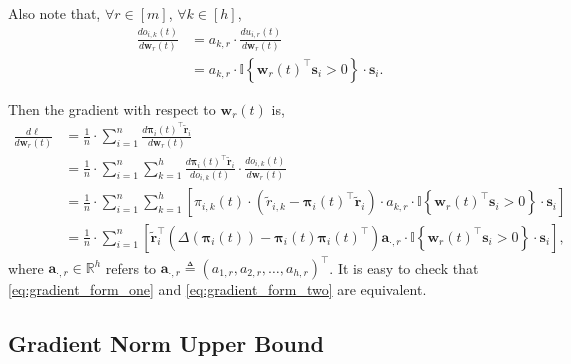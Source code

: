\documentclass[10pt]{article}
\def\rva{{\mathbf{a}}}
\def\rvs{{\mathbf{s}}}
\def\rvw{{\mathbf{w}}}
\def\rvtilder{{\tilde{\mathbf{r}}}}
\def\rvpi{{\boldsymbol{\pi}}}
\def\sR{{\mathbb{R}}}
\def\sI{{\mathbb{I}}}
\begin{document}
\noindent Also note that, $\forall r \in [m]$, $\forall k \in [h]$,
\begin{equation*}
\begin{split}
    \frac{d o_{i,k}(t)}{d \rvw_r(t)} &= a_{k,r} \cdot \frac{d u_{i,r}(t)}{d \rvw_r(t)} \\
    &= a_{k,r} \cdot \sI\left\{ \rvw_r(t)^\top \rvs_i > 0 \right\} \cdot \rvs_i.
\end{split}
\end{equation*}

\noindent Then the gradient with respect to $\rvw_r(t)$ is,
\begin{equation}
\label{eq:gradient_form_two}
\begin{split}
    \frac{d\ell}{d \rvw_r(t)} &= \frac{1}{n} \cdot \sum\limits_{i=1}^{n}{ \frac{d \rvpi_i(t)^\top \rvtilder_i}{d \rvw_r(t)} } \\
    &= \frac{1}{n} \cdot \sum\limits_{i=1}^{n}{ \sum\limits_{k=1}^{h}{ \frac{d \rvpi_i(t)^\top \rvtilder_i}{d o_{i,k}(t)}\cdot \frac{d o_{i,k}(t)}{d \rvw_r(t)} } } \\
    &= \frac{1}{n} \cdot \sum\limits_{i=1}^{n}{ \sum\limits_{k=1}^{h}{ \left[ \pi_{i,k}(t) \cdot \left( \tilde{r}_{i, k} - \rvpi_i(t)^\top \rvtilder_i \right) \cdot a_{k,r} \cdot \sI\left\{ \rvw_r(t)^\top \rvs_i > 0 \right\} \cdot \rvs_i  \right] }  } \\
    &= \frac{1}{n} \cdot \sum\limits_{i=1}^{n}{ \left[ \rvtilder_i^\top \left( \Delta\left( \rvpi_i(t) \right) - \rvpi_i(t) \rvpi_i(t)^\top \right) \rva_{\cdot, r} \cdot \sI\left\{ \rvw_r(t)^\top \rvs_i > 0 \right\} \cdot \rvs_i  \right] },
\end{split}
\end{equation}
where $\rva_{\cdot, r} \in \sR^h$ refers to $\rva_{\cdot, r} \triangleq \left( a_{1,r}, a_{2,r}, \dots, a_{h,r} \right)^\top$. It is easy to check that \cref{eq:gradient_form_one} and \cref{eq:gradient_form_two} are equivalent.

\subsection{Gradient Norm Upper Bound}
\end{document}

